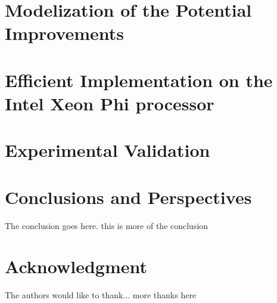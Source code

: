 \documentclass[10pt, conference, compsocconf]{IEEEtran}
\begin{document}
\section{Modelization of the Potential Improvements}
\label{sec:model}

\section{Efficient Implementation on the Intel Xeon Phi processor}
\label{sec:impl}

\section{Experimental Validation}
\label{sec:expe}







\section{Conclusions and Perspectives}
\label{sec:ccl}

The conclusion goes here. this is more of the conclusion

\section*{Acknowledgment}


The authors would like to thank...
more thanks here



\end{document}
